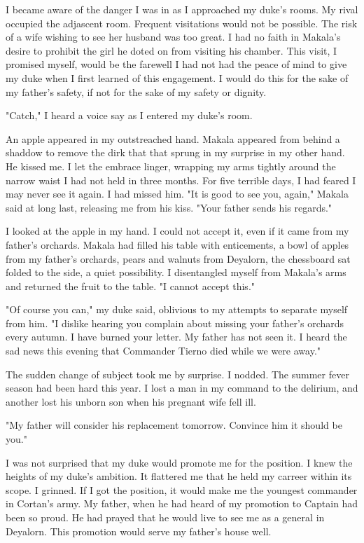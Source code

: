 \documentclass{article}
\begin{document}
I became aware of the danger I was in as I approached my duke's rooms. My rival occupied the adjascent room. Frequent visitations would not be possible. The risk of a wife wishing to see her husband was too great. I had no faith in Makala's desire to prohibit the girl he doted on from visiting his chamber. This visit, I promised myself, would be the farewell I had not had the peace of mind to give my duke when I first learned of this engagement. I would do this for the sake of my father's safety, if not for the sake of my safety or dignity.

"Catch,"  I heard a voice say as I entered my duke's room. 

An apple appeared in my outstreached hand. Makala appeared from behind a shaddow to remove the dirk that that sprung in my surprise in my other hand. He kissed me. I let the embrace linger, wrapping my arms tightly around the narrow waist I had not held in three months. For five terrible days, I had feared I may never see it again. I had missed him. "It is good to see you, again," Makala said at long last, releasing me from his kiss. "Your father sends his regards." 

I looked at the apple in my hand. I could not accept it, even if it came from my father's orchards. Makala had filled his table with enticements, a bowl of apples from my father's orchards, pears and walnuts from Deyalorn, the chessboard sat folded to the side, a quiet possibility. I disentangled myself from Makala's arms and returned the fruit to the table. "I cannot accept this."

"Of course you can," my duke said, oblivious to my attempts to separate myself from him. "I dislike hearing you complain about missing your father's orchards every autumn. I have burned your letter. My father has not seen it. I heard the sad news this evening that Commander Tierno died while we were away." 

The sudden change of subject took me by surprise. I nodded. The summer fever season had been hard this year. I lost a man in my command to the delirium, and another lost his unborn son when his pregnant wife fell ill. 

"My father will consider his replacement tomorrow. Convince him it should be you."

I was not surprised that my duke would promote me for the position. I knew the heights of my duke's ambition. It flattered me that he held my carreer within its scope. I grinned. If I got the position, it would make me the youngest commander in Cortan's army. My father, when he had heard of my promotion to Captain had been so proud. He had prayed that he would live to see me as a general in Deyalorn. This promotion would serve my father's house well.
 
\end{document}
